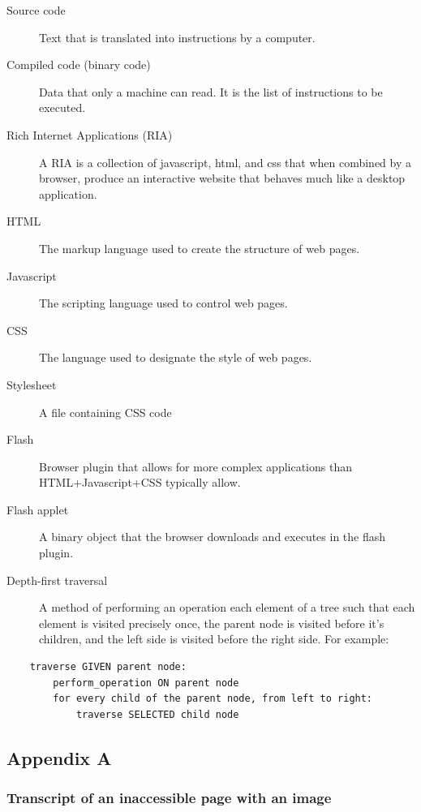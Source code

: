 \documentclass[]{article}
\begin{document}
\begin{description}
\item[Source code]
Text that is translated into instructions by a computer.
\item[Compiled code (binary code)]
Data that only a machine can read. It is the list of instructions to be
executed.
\item[Rich Internet Applications (RIA)]
A RIA is a collection of javascript, html, and css that when combined by
a browser, produce an interactive website that behaves much like a
desktop application.
\item[HTML]
The markup language used to create the structure of web pages.
\item[Javascript]
The scripting language used to control web pages.
\item[CSS]
The language used to designate the style of web pages.
\item[Stylesheet]
A file containing CSS code
\item[Flash]
Browser plugin that allows for more complex applications than
HTML+Javascript+CSS typically allow.
\item[Flash applet]
A binary object that the browser downloads and executes in the flash
plugin.
\item[Depth-first traversal]
A method of performing an operation each element of a tree such that
each element is visited precisely once, the parent node is visited
before it's children, and the left side is visited before the right
side. For example:
\end{description}

\begin{verbatim}
    traverse GIVEN parent node:
        perform_operation ON parent node
        for every child of the parent node, from left to right:
            traverse SELECTED child node
\end{verbatim}

\clearpage

\subsection{Appendix A}\label{appendix-a}

\subsubsection{Transcript of an inaccessible page with an
image}\label{transcript-of-an-inaccessible-page-with-an-image}
\end{document}

